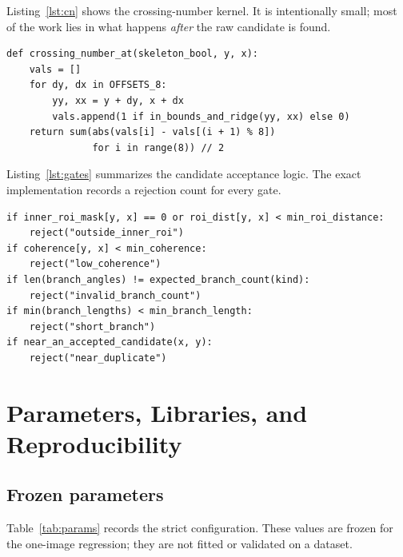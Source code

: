 \documentclass[11pt]{article}
\begin{document}
Listing~\ref{lst:cn} shows the crossing-number kernel. It is intentionally small; most of the work lies in what happens \emph{after} the raw candidate is found.

\begin{lstlisting}[caption={Crossing number on the ordered 8-neighborhood.},label={lst:cn}]
def crossing_number_at(skeleton_bool, y, x):
    vals = []
    for dy, dx in OFFSETS_8:
        yy, xx = y + dy, x + dx
        vals.append(1 if in_bounds_and_ridge(yy, xx) else 0)
    return sum(abs(vals[i] - vals[(i + 1) % 8])
               for i in range(8)) // 2
\end{lstlisting}

Listing~\ref{lst:gates} summarizes the candidate acceptance logic. The exact implementation records a rejection count for every gate.

\begin{lstlisting}[caption={Conservative candidate gates, abbreviated.},label={lst:gates}]
if inner_roi_mask[y, x] == 0 or roi_dist[y, x] < min_roi_distance:
    reject("outside_inner_roi")
if coherence[y, x] < min_coherence:
    reject("low_coherence")
if len(branch_angles) != expected_branch_count(kind):
    reject("invalid_branch_count")
if min(branch_lengths) < min_branch_length:
    reject("short_branch")
if near_an_accepted_candidate(x, y):
    reject("near_duplicate")
\end{lstlisting}

\section{Parameters, Libraries, and Reproducibility}

\subsection{Frozen parameters}

Table~\ref{tab:params} records the strict configuration. These values are frozen for the one-image regression; they are not fitted or validated on a dataset.
\end{document}
